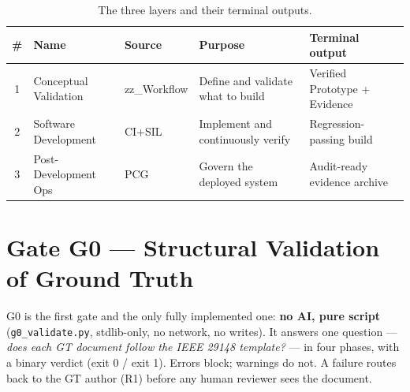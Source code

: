 \documentclass[11pt,a4paper]{article}
\begin{document}
\begin{table}[htbp]
\centering
\caption{The three layers and their terminal outputs.}
\label{tab:layers}
\small
\begin{tabular}{@{}clllp{4.0cm}@{}}
\toprule
\textbf{\#} & \textbf{Name} & \textbf{Source} & \textbf{Purpose} & \textbf{Terminal output} \\
\midrule
1 & Conceptual Validation & zz\_Workflow & Define and validate what to build & Verified Prototype + Evidence \\
2 & Software Development & CI+SIL & Implement and continuously verify & Regression-passing build \\
3 & Post-Development Ops & PCG & Govern the deployed system & Audit-ready evidence archive \\
\bottomrule
\end{tabular}
\end{table}

\section{Gate G0 --- Structural Validation of Ground Truth}

G0 is the first gate and the only fully implemented one: \textbf{no AI, pure script}
(\texttt{g0\_validate.py}, stdlib-only, no network, no writes). It answers one question ---
\emph{does each GT document follow the IEEE 29148 template?} --- in four phases, with a
binary verdict (exit 0 / exit 1). Errors block; warnings do not. A failure routes back to the
GT author (R1) before any human reviewer sees the document.
\end{document}
